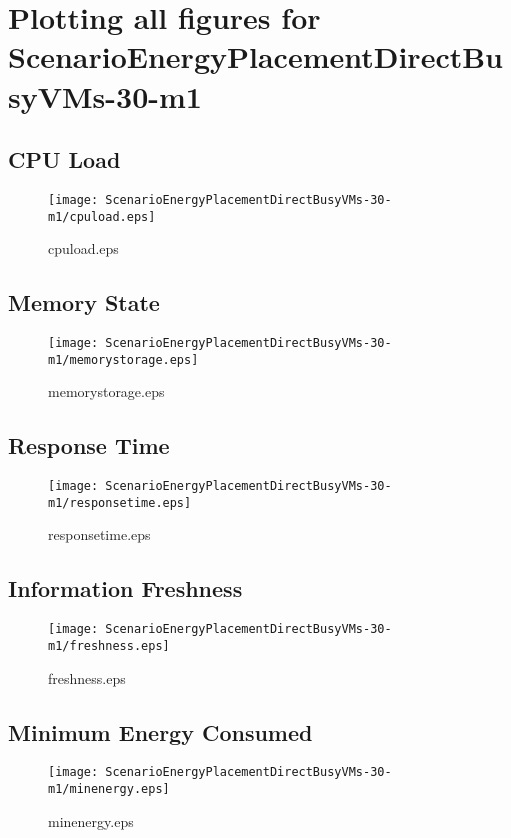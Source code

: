 \documentclass{elsart}
\begin{document}
\section{Plotting all figures for ScenarioEnergyPlacementDirectBusyVMs-30-m1}
\subsection{CPU Load}

\begin{figure}[ht]
\centering
\texttt{[image: ScenarioEnergyPlacementDirectBusyVMs-30-m1/cpuload.eps]}
\caption{cpuload.eps}\label{fig:cpuload}
\end{figure}

\clearpage
\subsection{Memory State}

\begin{figure}[ht]
\centering
\texttt{[image: ScenarioEnergyPlacementDirectBusyVMs-30-m1/memorystorage.eps]}
\caption{memorystorage.eps}\label{fig:memorystorage}
\end{figure}

\clearpage
\subsection{Response Time}

\begin{figure}[ht]
\centering
\texttt{[image: ScenarioEnergyPlacementDirectBusyVMs-30-m1/responsetime.eps]}
\caption{responsetime.eps}\label{fig:responsetime}
\end{figure}

\clearpage
\subsection{Information Freshness}

\begin{figure}[ht]
\centering
\texttt{[image: ScenarioEnergyPlacementDirectBusyVMs-30-m1/freshness.eps]}
\caption{freshness.eps}\label{fig:freshness}
\end{figure}

\clearpage
\subsection{Minimum Energy Consumed}

\begin{figure}[ht]
\centering
\texttt{[image: ScenarioEnergyPlacementDirectBusyVMs-30-m1/minenergy.eps]}
\caption{minenergy.eps}\label{fig:minenergy}
\end{figure}
\end{document}
